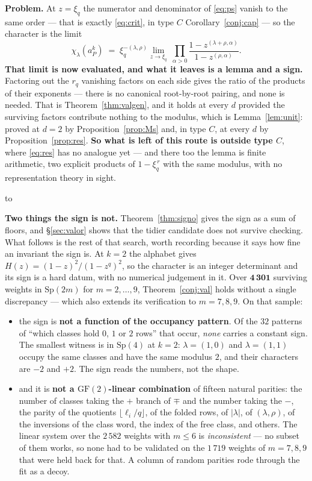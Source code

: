 \documentclass[11pt,a4paper]{article}
\theoremstyle{definition}
\newcommand{\Sp}{\mathrm{Sp}}
\newenvironment{keybox}
  {\par\vspace{9pt}\begin{lrbox}{\fichabox}%
   \begin{minipage}{0.90\textwidth}\vspace{7pt}\setlength{\parskip}{3pt}}
  {\vspace{7pt}\end{minipage}\end{lrbox}%
   \par\noindent\hbox to \textwidth{\hfill
   \textcolor{azul}{\rule[-\dp\fichabox]{3.2pt}{\dimexpr\ht\fichabox+\dp\fichabox\relax}}%
   \colorbox{fondoficha}{\usebox{\fichabox}}\hfill}%
   \par\vspace{9pt}}
\begin{document}
\begin{keybox}
\textbf{Problem.} At $z=\xi_q$ the numerator and denominator of \eqref{eq:ps} vanish to the same
order --- that is exactly \eqref{eq:crit}, in type $C$ Corollary~\ref{conj:cap} --- so the character is
the limit
\[
\chi_\lambda(a_P^k)\;=\;\xi_q^{-(\lambda,\rho)}\lim_{z\to\xi_q}\ \prod_{\alpha>0}
\frac{1-z^{(\lambda+\rho,\alpha)}}{1-z^{(\rho,\alpha)}} .
\]
\textbf{That limit is now evaluated, and what it leaves is a lemma and a sign.} Factoring out the
$r_q$ vanishing factors on each side gives the ratio of the products of their exponents --- there is
no canonical root-by-root pairing, and none is needed. That is Theorem~\ref{thm:valgen}, and it
holds at every $d$ provided the surviving factors contribute nothing to the modulus, which is
Lemma~\ref{lem:unit}: proved at $d=2$ by Proposition~\ref{prop:Ms} and, in type $C$, at every $d$ by
Proposition~\ref{prop:res}. \textbf{So what is left of this route is outside type $C$}, where
\eqref{eq:res} has no analogue yet --- and there too the lemma is finite arithmetic, two explicit
products of $1-\xi_q^{\,r}$ with the same modulus, with no representation theory in sight.
\end{keybox}

\smallskip
\noindent\textbf{Two things the sign is not.} Theorem~\ref{thm:signo} gives the sign as a sum of
floors, and \S\ref{sec:valor} shows that the tidier candidate does not survive checking. What
follows is the rest of that search, worth recording because it says how fine an invariant the sign
is. At $k=2$ the alphabet gives
$H(z)=(1-z)^2/(1-z^q)^2$, so the character is an integer determinant and its sign is a hard datum,
with no numerical judgement in it. Over $\mathbf{4\,301}$ surviving weights in $\Sp(2m)$ for
$m=2,\dots,9$, Theorem~\ref{conj:val} holds without a single discrepancy --- which also extends its
verification to $m=7,8,9$. On that sample:

\begin{itemize}\itemsep2pt
\item the sign is \textbf{not a function of the occupancy pattern}. Of the $32$ patterns of ``which
classes hold $0$, $1$ or $2$ rows'' that occur, \emph{none} carries a constant sign. The smallest
witness is in $\Sp(4)$ at $k=2$: $\lambda=(1,0)$ and $\lambda=(1,1)$ occupy the same classes and
have the same modulus $2$, and their characters are $-2$ and $+2$. The sign reads the numbers,
not the shape.
\item and it is \textbf{not a $\mathrm{GF}(2)$-linear combination} of fifteen natural parities: the
number of classes taking the $+$ branch of $\mp$ and the number taking the $-$, the parity of the
quotients $\lfloor\ell_i/q\rfloor$, of the folded rows, of $|\lambda|$, of $(\lambda,\rho)$, of the
inversions of the class word, the index of the free class, and others. The linear system over the
$2\,582$ weights with $m\le6$ is \emph{inconsistent} --- no subset of them works, so none had to be
validated on the $1\,719$ weights of $m=7,8,9$ that were held back for that. A column of random
parities rode through the fit as a decoy.
\end{itemize}
\end{document}
